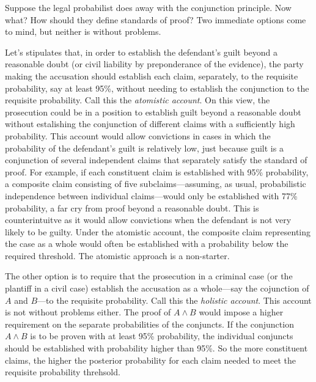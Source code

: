 \documentclass[10pt,dvipsnames,enabledeprecatedfontcommands]{scrartcl}
\newcommand{\et}{\wedge}
\begin{document}
Suppose the legal probabilist does away with the conjunction principle.
Now what? How should they define standards of proof? Two immediate
options come to mind, but neither is without problems.

Let's stipulates that, in order to establish the defendant's guilt
beyond a reasonable doubt (or civil liability by preponderance of the
evidence), the party making the accusation should establish each claim,
separately, to the requisite probability, say at least 95\%, without
needing to establish the conjunction to the requisite probability. Call
this the \textit{atomistic account}. On this view, the prosecution could
be in a position to establish guilt beyond a reasonable doubt without
estalishing the conjunction of different claims with a sufficiently high
probability. This account would allow convictions in cases in which the
probability of the defendant's guilt is relatively low, just because
guilt is a conjunction of several independent claims that separately
satisfy the standard of proof. For example, if each constituent claim is
established with 95\% probability, a composite claim consisting of five
subclaims---assuming, as usual, probabilistic independence between
individual claims---would only be established with 77\% probability, a
far cry from proof beyond a reasonable doubt. This is counterintuitve as
it would allow convictions when the defendant is not very likely to be
guilty. Under the atomistic account, the composite claim representing
the case as a whole would often be established with a probability below
the required threshold. The atomistic approach is a non-starter.

The other option is to require that the prosecution in a criminal case
(or the plantiff in a civil case) establish the accusation as a
whole---say the cojunction of \(A\) and \(B\)---to the requisite
probability. Call this the \textit{holistic account}. This account is
not without problems either. The proof of \(A\et B\) would impose a
higher requirement on the separate probabilities of the conjuncts. If
the conjunction \(A\et B\) is to be proven with at least 95\%
probability, the individual conjuncts should be established with
probability higher than 95\%. So the more constituent claims, the higher
the posterior probability for each claim needed to meet the requisite
probability threhsold.
\end{document}
